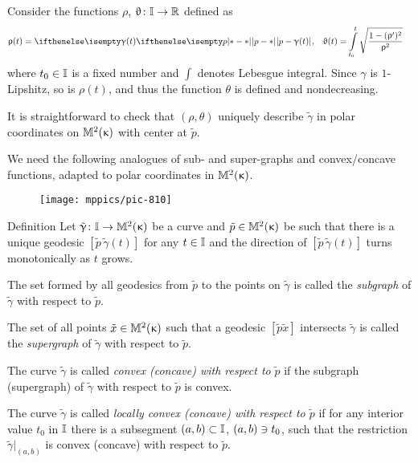 Consider the functions $\rho$, $\theta\:\II\to\RR$ defined as 
\begin{align*}
\rho(t)
&=\dist{p}{\gamma(t)}{},
&
\theta(t)
&=
\int\limits_{t_0}^{t}\sqrt{\frac{1-(\rho')^2}{\rho^2}}
\end{align*}
where $t_0\in\II$ is a fixed number and $\int$  denotes Lebesgue integral.
Since $\gamma$ is $1$-Lipshitz, so is $\rho(t)$, and thus the function $\theta$ is defined and nondecreasing.

It is straightforward to check that $(\rho,\theta)$ uniquely describe $\tilde \gamma$ in polar coordinates on $\mathbb{M}_{{}}^{2}({\upkappa})$ with center at $\tilde p$.
\qeds
                                                                                                                                                                                                                                                                                                                                                                        
We need the following analogues of sub- and super-graphs %
 and convex/concave functions, adapted to polar coordinates in $\mathbb{M}_{{}}^{2}({\upkappa})$.

\begin{wrapfigure}{o}{38 mm}
\vskip-0mm
\centering
\texttt{[image: mppics/pic-810]}
\end{wrapfigure}

\begin{thm}{Definition}\label{def:convex-devel}
Let $\tilde \gamma\:\II\to\Lob2\kappa$ be a curve and $\tilde p\in\Lob2\kappa$ be such that there is a unique geodesic $[\tilde p\,\tilde \gamma(t)]$ for any $t\in\II$ and the direction of $[\tilde p\,\tilde \gamma(t)]$ turns monotonically as $t$ grows.

The set formed by all geodesics from  $\tilde p$ to the points on $\tilde \gamma$ is called the  \emph{subgraph} of $\tilde \gamma$ with respect to $\tilde p$.

The set of all points $\tilde x\in\Lob2{\kappa}$ such that a geodesic $[\tilde p\tilde x]$ intersects $\tilde \gamma$ is called the \emph{supergraph} of $\tilde \gamma$ with respect to $\tilde p$.

The curve $\tilde \gamma$ is called \emph{convex (concave) with respect to} $\tilde p$ if the subgraph (supergraph) of $\tilde \gamma$ with respect to $\tilde p$ is convex.

The curve $\tilde \gamma$ is called 
\emph{locally convex (concave) with respect to $\tilde p$} 
if for any interior value $t_0$ in $\mathbb{I}$ there is a subsegment $(a,b)\subset\II$, $(a,b)\z\ni t_0$, such that the restriction $\tilde \gamma|_{(a,b)}$ is convex (concave) with respect to $\tilde p$.
\end{thm}

